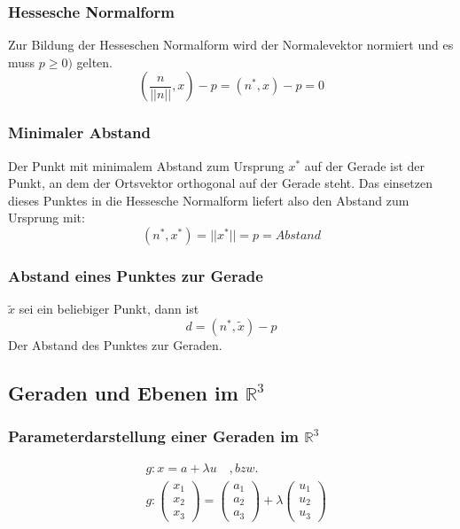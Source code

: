 \documentclass[12pt,a4paper]{article}%
\numberwithin{equation}{section}
\newcommand{\R}{\mathbb{R}} %
\def\vecT#1{\left(\begin{array}{c} #1 \end{array}\right)}
\numberwithin{equation}{subsection}
\begin{document}
    \subsubsection{Hessesche Normalform}
    Zur Bildung der Hesseschen Normalform wird der Normalevektor normiert und es muss $p \geq 0)$ gelten. 
    \begin{equation}
      \left(\frac{n}{||n||},x\right)-p = (n^*,x)-p = 0
    \end{equation}
    \subsubsection{Minimaler Abstand}
    Der Punkt mit minimalem Abstand zum Ursprung $x^*$ auf der Gerade ist der Punkt, an dem der Ortsvektor orthogonal auf der Gerade steht. Das einsetzen dieses Punktes in die Hessesche Normalform liefert also den Abstand zum Ursprung mit:
    \begin{equation}
    (n^*,x^*)=||x^*|| = p = Abstand
    \end{equation}
    \subsubsection{Abstand eines Punktes zur Gerade}
    $\tilde{x}$ sei ein beliebiger Punkt, dann ist
    \begin{equation}
      d = (n^*, \tilde{x})-p
    \end{equation}
    Der Abstand des Punktes zur Geraden.
  \subsection{Geraden und Ebenen im $\R^3$}
    \subsubsection{Parameterdarstellung einer Geraden im $\R^3$}
    \begin{align}
      &g: x = a + \lambda u \quad ,bzw. \nonumber \\
      &g: \vecT{x_1 \\ x_2 \\ x_3} = \vecT{a_1 \\ a_2 \\ a_3} + \lambda \vecT{u_1 \\ u_2 \\ u_3}
    \end{align}
\end{document}
